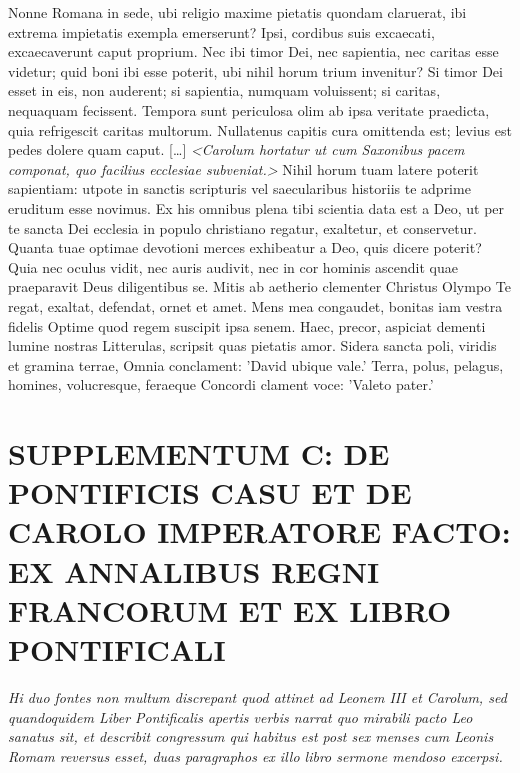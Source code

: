 \documentclass[12pt]{article}
\begin{document}
{		\pend
		\pstart
		Nonne Romana in sede, ubi religio maxime pietatis quondam claruerat, ibi extrema impietatis exempla emerserunt? Ipsi, cordibus suis excaecati, excaecaverunt caput proprium. Nec ibi timor Dei, nec sapientia, nec caritas esse videtur; quid boni ibi esse poterit, ubi nihil horum trium invenitur? Si timor Dei esset in eis, non auderent; si sapientia, numquam voluissent; si caritas, nequaquam fecissent. Tempora sunt periculosa olim ab ipsa veritate praedicta, quia refrigescit caritas multorum.
		\pend
		\pstart
		Nullatenus capitis cura omittenda est; levius est pedes dolere quam caput. [\dots] \textit{<Carolum hortatur ut cum Saxonibus pacem componat, quo facilius ecclesiae subveniat.>}
		\pend
		\pstart
		Nihil horum tuam latere poterit sapientiam: utpote in sanctis scripturis vel saecularibus historiis te adprime eruditum esse novimus. Ex his omnibus plena tibi scientia data est a Deo, ut per te sancta Dei ecclesia in populo christiano regatur, exaltetur, et conservetur. Quanta tuae optimae devotioni merces exhibeatur a Deo, quis dicere poterit? Quia nec oculus vidit, nec auris audivit, nec in cor hominis ascendit quae praeparavit Deus diligentibus se.
		\pend
		\vskip 12pt
		\pstart
		\indent Mitis ab aetherio clementer Christus Olympo\newline
		\indent Te regat, exaltat, defendat, ornet et amet.
		\pend
		\vskip 12pt
		\pstart
		\indent Mens mea congaudet, bonitas iam vestra fidelis\newline
		\indent\indent Optime quod regem suscipit ipsa senem.\newline
		\indent Haec, precor, aspiciat dementi lumine nostras\newline
		\indent\indent Litterulas, scripsit quas pietatis amor.\newline
		\indent Sidera sancta poli, viridis et gramina terrae,\newline
		\indent\indent Omnia conclament: 'David ubique vale.'\newline
		\indent Terra, polus, pelagus, homines, volucresque, feraeque\newline
		\indent\indent Concordi clament voce: 'Valeto pater.'
		\pend
		\endnumbering
		
		\clearpage
		\section{SUPPLEMENTUM C: DE PONTIFICIS CASU ET DE CAROLO IMPERATORE FACTO:\\ EX ANNALIBUS REGNI FRANCORUM ET EX LIBRO PONTIFICALI}
		\textit{Hi duo fontes non multum discrepant quod attinet ad Leonem III et Carolum, sed quandoquidem {\normalfont Liber Pontificalis} apertis verbis narrat quo mirabili pacto Leo sanatus sit, et describit congressum qui habitus est post sex menses cum Leonis Romam reversus esset, duas paragraphos ex illo libro sermone mendoso excerpsi.}\\
		
}
\end{document}
